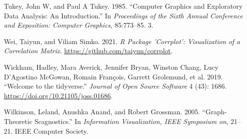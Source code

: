 \begin{CSLReferences}{1}{0}
\leavevmode{}%
Tukey, John W, and Paul A Tukey. 1985. {``Computer Graphics and Exploratory Data Analysis: An Introduction.''} In \emph{Proceedings of the Sixth Annual Conference and Exposition: Computer Graphics}, 85:773--85. 3.

\leavevmode{}%
Wei, Taiyun, and Viliam Simko. 2021. \emph{R Package 'Corrplot': Visualization of a Correlation Matrix}. \url{https://github.com/taiyun/corrplot}.

\leavevmode{}%
Wickham, Hadley, Mara Averick, Jennifer Bryan, Winston Chang, Lucy D'Agostino McGowan, Romain François, Garrett Grolemund, et al. 2019. {``Welcome to the {tidyverse}.''} \emph{Journal of Open Source Software} 4 (43): 1686. \url{https://doi.org/10.21105/joss.01686}.

\leavevmode{}%
Wilkinson, Leland, Anushka Anand, and Robert Grossman. 2005. {``Graph-Theoretic Scagnostics.''} In \emph{Information Visualization, IEEE Symposium on}, 21--21. IEEE Computer Society.

\end{CSLReferences}



\address{%
Amit Chinwan\\
Maynooth University\\%
Hamilton Institute\\ Maynooth, Ireland\\
%
%
%
\href{mailto:amit.chinwan.2019@mumail.ie}{\nolinkurl{amit.chinwan.2019@mumail.ie}}%
}

\address{%
Catherine Hurley\\
Maynooth University\\%
Department of Mathematics and Statistics\\ Maynooth, Ireland\\
%
%
%
\href{mailto:catherine.hurley@mu.ie}{\nolinkurl{catherine.hurley@mu.ie}}%
}
